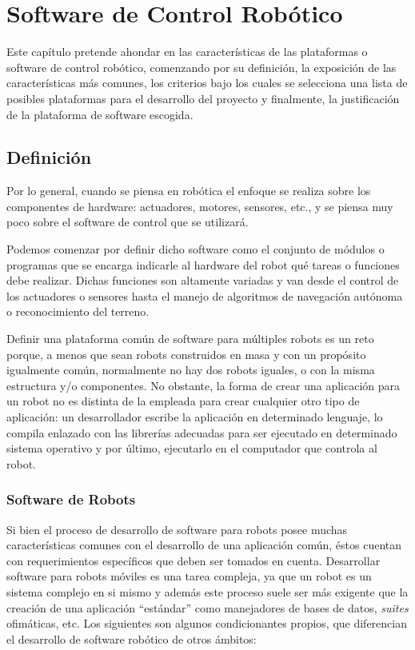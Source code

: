 \chapter{Software de Control Robótico}

Este capítulo pretende ahondar en las características de las plataformas o software de control robótico, comenzando por su definición, la exposición de las características más comunes, los criterios bajo los cuales se selecciona una lista de posibles plataformas para el desarrollo del proyecto y finalmente, la justificación de la plataforma de software escogida.

\section{Definición}

Por lo general, cuando se piensa en robótica el enfoque se realiza sobre los componentes de hardware: actuadores, motores, sensores, etc., y se piensa muy poco sobre el software de control que se utilizará.

Podemos comenzar por definir dicho software como el conjunto de módulos o programas que se encarga indicarle al hardware del robot qué tareas o funciones debe realizar. Dichas funciones son altamente variadas y van desde el control de los actuadores o sensores hasta el manejo de algoritmos de navegación autónoma o reconocimiento del terreno.

Definir una plataforma común de software para múltiples robots es un reto porque, a menos que sean robots construidos en masa y con un propósito igualmente común, normalmente no hay dos robots iguales, o con la misma estructura y/o componentes. No obstante, la forma de crear una aplicación para un robot no es distinta de la empleada para crear cualquier otro tipo de aplicación: un desarrollador escribe la aplicación en determinado lenguaje, lo compila enlazado con las librerías adecuadas para ser ejecutado en determinado sistema operativo y por último, ejecutarlo en el computador que controla al robot.

\subsection{Software de Robots}

Si bien el proceso de desarrollo de software para robots posee muchas características comunes con el desarrollo de una aplicación común, éstos cuentan con requerimientos específicos que deben ser tomados en cuenta. Desarrollar software para robots móviles es una tarea compleja, ya que un robot es un sistema complejo en si mismo y además este proceso suele ser más exigente que la creación de una aplicación ``estándar'' como manejadores de bases de datos, \textit{suites} ofimáticas, etc. Los siguientes son algunos condicionantes propios, que diferencian el desarrollo de software robótico de otros ámbitos:

